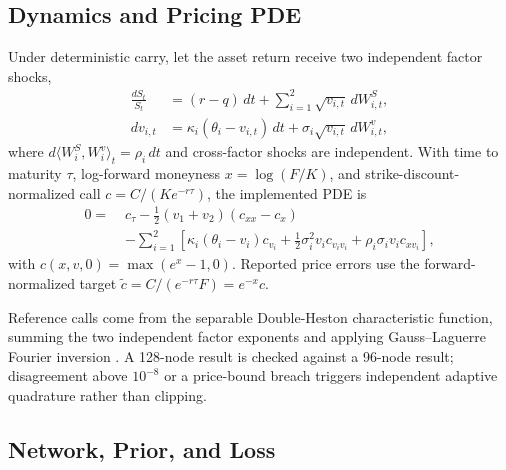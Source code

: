 \documentclass[conference]{IEEEtran}
\begin{document}
\subsection{Dynamics and Pricing PDE}

Under deterministic carry, let the asset return receive two independent factor
shocks,
\begin{align}
\frac{dS_t}{S_t} &= (r-q)\,dt + \sum_{i=1}^{2}\sqrt{v_{i,t}}\,dW^{S}_{i,t},\\
dv_{i,t} &= \kappa_i(\theta_i - v_{i,t})\,dt + \sigma_i\sqrt{v_{i,t}}\,dW^{v}_{i,t},
\end{align}
where $d\langle W^{S}_i, W^{v}_i\rangle_t = \rho_i\,dt$ and cross-factor shocks
are independent. With time to maturity $\tau$, log-forward moneyness
$x=\log(F/K)$, and strike-discount-normalized call $c = C/(Ke^{-r\tau})$, the
implemented PDE is
\begin{align}
0 = \;& c_\tau - \tfrac{1}{2}(v_1+v_2)\left(c_{xx}-c_x\right) \nonumber\\
 &- \sum_{i=1}^{2}\left[\kappa_i(\theta_i-v_i)c_{v_i}
   + \tfrac{1}{2}\sigma_i^2 v_i c_{v_i v_i}
   + \rho_i \sigma_i v_i c_{x v_i}\right],
\end{align}
with $c(x,v,0)=\max(e^{x}-1,0)$. Reported price errors use the
forward-normalized target $\tilde{c}=C/(e^{-r\tau}F)=e^{-x}c$.

Reference calls come from the separable Double-Heston characteristic function,
summing the two independent factor exponents and applying Gauss--Laguerre
Fourier inversion \cite{heston1993,carr1999,lord2010}. A 128-node result is
checked against a 96-node result; disagreement above $10^{-8}$ or a price-bound
breach triggers independent adaptive quadrature rather than clipping.

\subsection{Network, Prior, and Loss}
\end{document}
